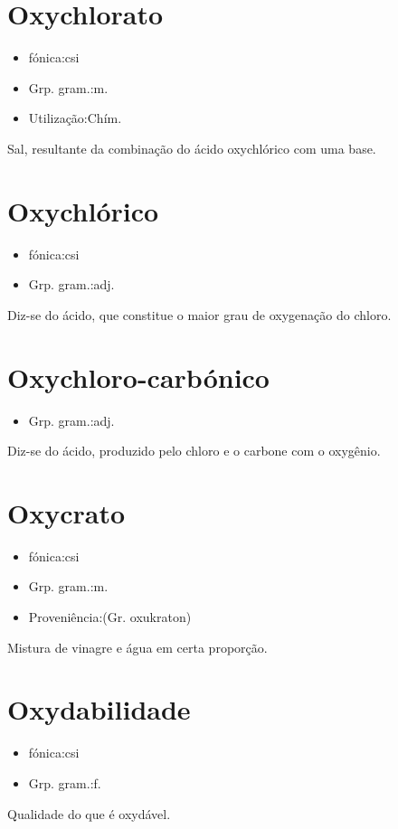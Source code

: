 \section{Oxychlorato}
\begin{itemize}
\item {fónica:csi}
\end{itemize}
\begin{itemize}
\item {Grp. gram.:m.}
\end{itemize}
\begin{itemize}
\item {Utilização:Chím.}
\end{itemize}
Sal, resultante da combinação do ácido oxychlórico com uma base.
\section{Oxychlórico}
\begin{itemize}
\item {fónica:csi}
\end{itemize}
\begin{itemize}
\item {Grp. gram.:adj.}
\end{itemize}
Diz-se do ácido, que constitue o maior grau de oxygenação do chloro.
\section{Oxychloro-carbónico}
\begin{itemize}
\item {Grp. gram.:adj.}
\end{itemize}
Diz-se do ácido, produzido pelo chloro e o carbone com o oxygênio.
\section{Oxycrato}
\begin{itemize}
\item {fónica:csi}
\end{itemize}
\begin{itemize}
\item {Grp. gram.:m.}
\end{itemize}
\begin{itemize}
\item {Proveniência:(Gr. \textunderscore oxukraton\textunderscore )}
\end{itemize}
Mistura de vinagre e água em certa proporção.
\section{Oxydabilidade}
\begin{itemize}
\item {fónica:csi}
\end{itemize}
\begin{itemize}
\item {Grp. gram.:f.}
\end{itemize}
Qualidade do que é oxydável.
